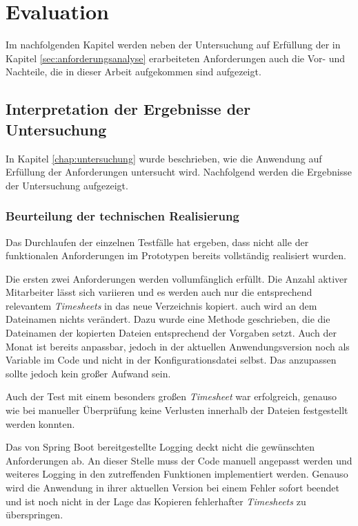 \chapter{Evaluation}
Im nachfolgenden Kapitel werden neben der Untersuchung auf Erfüllung der in Kapitel \ref{sec:anforderungsanalyse} erarbeiteten Anforderungen auch die Vor- und Nachteile, die in dieser Arbeit aufgekommen sind aufgezeigt.

\section{Interpretation der Ergebnisse der Untersuchung}
\label{sec:untersuchung}
In Kapitel \ref{chap:untersuchung} wurde beschrieben, wie die Anwendung auf Erfüllung der Anforderungen untersucht wird. Nachfolgend werden die Ergebnisse der Untersuchung aufgezeigt.

\subsection{Beurteilung der technischen Realisierung}
Das Durchlaufen der einzelnen Testfälle hat ergeben, dass nicht alle der funktionalen Anforderungen im Prototypen bereits vollständig realisiert wurden.

Die ersten zwei Anforderungen werden vollumfänglich erfüllt. Die Anzahl aktiver Mitarbeiter lässt sich variieren und es werden auch nur die entsprechend relevantem \textit{\glspl{Timesheet}} in das neue Verzeichnis kopiert. auch wird an dem Dateinamen nichts verändert. Dazu wurde eine Methode geschrieben, die die Dateinamen der kopierten Dateien entsprechend der Vorgaben setzt. Auch der Monat ist bereits anpassbar, jedoch in der aktuellen Anwendungsversion noch als Variable im Code und nicht in der Konfigurationsdatei selbst. Das anzupassen sollte jedoch kein großer Aufwand sein.

Auch der Test mit einem besonders großen \textit{\gls{Timesheet}} war erfolgreich, genauso wie bei \mbox{manueller} Überprüfung keine Verlusten innerhalb der Dateien festgestellt werden konnten.

Das von \gls{Spring Boot} bereitgestellte Logging deckt nicht die gewünschten Anforderungen ab. An dieser Stelle muss der Code manuell angepasst werden und weiteres Logging in den zutreffenden Funktionen implementiert werden. Genauso wird die Anwendung in ihrer aktuellen Version bei einem Fehler sofort beendet und ist noch nicht in der Lage das Kopieren fehlerhafter \textit{\glspl{Timesheet}} zu überspringen. \pagebreak

